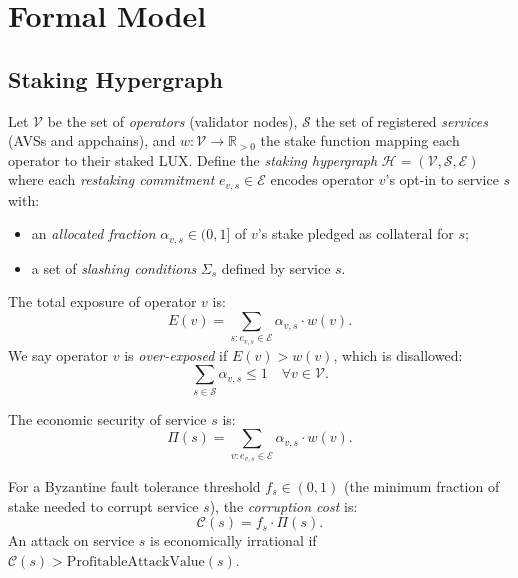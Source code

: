 \section{Formal Model}

\label{sec:model}

\subsection{Staking Hypergraph}

\begin{definition}
Let $\mathcal{V}$ be the set of \emph{operators} (validator nodes), $\mathcal{S}$ the set
of registered \emph{services} (AVSs and appchains), and $w: \mathcal{V} \to \mathbb{R}_{>0}$
the stake function mapping each operator to their staked LUX. Define the
\emph{staking hypergraph} $\mathcal{H} = (\mathcal{V}, \mathcal{S}, \mathcal{E})$ where
each \emph{restaking commitment} $e_{v,s} \in \mathcal{E}$ encodes operator $v$'s
opt-in to service $s$ with:
\begin{itemize}
  \item an \emph{allocated fraction} $\alpha_{v,s} \in (0,1]$ of $v$'s stake pledged as
    collateral for $s$;
  \item a set of \emph{slashing conditions} $\Sigma_s$ defined by service $s$.
\end{itemize}
\end{definition}

\begin{definition}
The total exposure of operator $v$ is:
\[
  E(v) = \sum_{s: e_{v,s} \in \mathcal{E}} \alpha_{v,s} \cdot w(v).
\]
We say operator $v$ is \emph{over-exposed} if $E(v) > w(v)$, which is disallowed:
\[
  \sum_{s \in \mathcal{S}} \alpha_{v,s} \leq 1 \quad \forall v \in \mathcal{V}.
\]
\end{definition}

\begin{definition}
The economic security of service $s$ is:
\[
  \Pi(s) = \sum_{v: e_{v,s} \in \mathcal{E}} \alpha_{v,s} \cdot w(v).
\]
\end{definition}

\begin{definition}
For a Byzantine fault tolerance threshold $f_s \in (0,1)$ (the minimum fraction of
stake needed to corrupt service $s$), the \emph{corruption cost} is:
\[
  \mathcal{C}(s) = f_s \cdot \Pi(s).
\]
An attack on service $s$ is economically irrational if $\mathcal{C}(s) > \text{ProfitableAttackValue}(s)$.
\end{definition}

